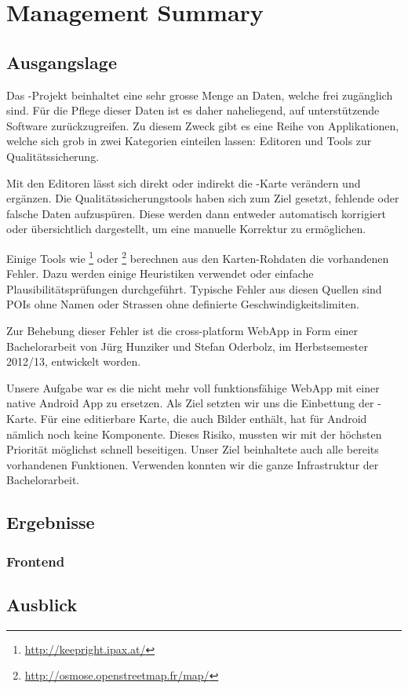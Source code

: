 \chapter*{Management Summary}
\thispagestyle{scrheadings}

\section*{Ausgangslage}
Das -Projekt beinhaltet eine sehr grosse Menge an Daten, welche frei zugänglich sind.
Für die Pflege dieser Daten ist es daher naheliegend, auf unterstützende Software zurückzugreifen.
Zu diesem Zweck gibt es eine Reihe von Applikationen, welche sich grob in zwei Kategorien einteilen lassen:
Editoren und Tools zur Qualitätssicherung.

Mit den Editoren lässt sich direkt oder indirekt die -Karte verändern und ergänzen.
Die Qualitätssicherungstools haben sich zum Ziel gesetzt, fehlende oder falsche Daten aufzuspüren.
Diese werden dann entweder automatisch korrigiert oder übersichtlich dargestellt, um eine manuelle Korrektur zu ermöglichen.

Einige Tools wie \footnote{\url{http://keepright.ipax.at/}} oder \footnote{\url{http://osmose.openstreetmap.fr/map/}} berechnen aus den Karten-Rohdaten die vorhandenen Fehler.
Dazu werden einige Heuristiken verwendet oder einfache Plausibilitätsprüfungen durchgeführt.
Typische Fehler aus diesen Quellen sind \glspl{POI} ohne Namen oder Strassen ohne definierte Geschwindigkeitslimiten.

Zur Behebung dieser Fehler ist die cross-platform \gls{WebApp} \kort{} in Form einer Bachelorarbeit von Jürg Hunziker und Stefan Oderbolz, im Herbstsemester 2012/13, entwickelt  worden.

Unsere Aufgabe war es die nicht mehr voll funktionsfähige \gls{WebApp} mit einer native Android App zu ersetzen.
Als Ziel setzten wir uns die Einbettung der -Karte.
Für eine editierbare Karte, die auch Bilder enthält, hat  für Android nämlich noch keine Komponente. 
Dieses Risiko, mussten wir mit der höchsten Priorität möglichst schnell beseitigen.
Unser Ziel beinhaltete auch alle bereits vorhandenen Funktionen.
Verwenden konnten wir die ganze Infrastruktur der \kort{} Bachelorarbeit.


\section*{Ergebnisse}

\subsection*{Frontend}

\section*{Ausblick}
